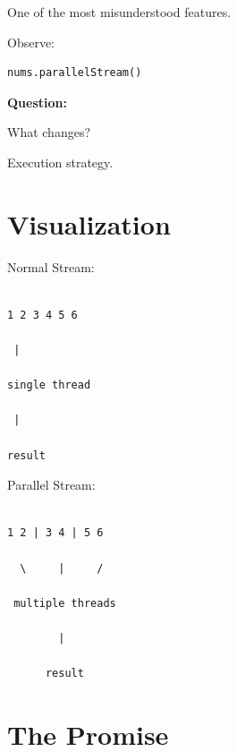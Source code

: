 \documentclass[11pt,a4paper]{book}
\begin{document}
One of the most misunderstood
features.


Observe:

\begin{verbatim} 
nums.parallelStream()
\end{verbatim}


\textbf{Question:}


What changes?


Execution strategy.


\section{Visualization}

Normal Stream:

\begin{verbatim}

1 2 3 4 5 6

 |

single thread

 |

result

\end{verbatim}


Parallel Stream:

\begin{verbatim}

1 2 | 3 4 | 5 6

  \     |     /

 multiple threads

        |

      result

\end{verbatim}


\section{The Promise}
\end{document}
